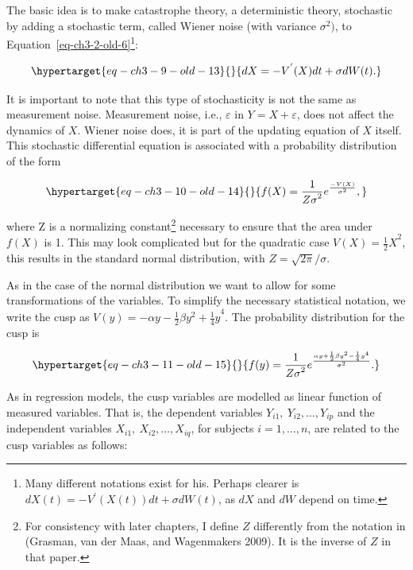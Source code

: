 \documentclass[
  a4paper,
  DIV=11,
  numbers=noendperiod,
  oneside]{scrreprt}
\begin{document}
The basic idea is to make catastrophe theory, a deterministic theory,
stochastic by adding a stochastic term, called Wiener noise (with
variance \(\sigma^{2})\), to Equation~\ref{eq-ch3-2-old-6}\footnote{Many
  different notations exist for his. Perhaps clearer is
  \(dX(t) = - V^{'}\left( X(t) \right)dt + \sigma dW(t)\), as \(dX\) and
  \(dW\) depend on time.}:

\begin{equation}\protect\hypertarget{eq-ch3-9-old-13}{}{
dX = - V^{'}(X)dt + \sigma dW(t).}\label{eq-ch3-9-old-13}\end{equation}

It is important to note that this type of stochasticity is not the same
as measurement noise. Measurement noise, i.e., \(\varepsilon\) in
\(Y = X + \varepsilon\), does not affect the dynamics of \(X\). Wiener
noise does, it is part of the updating equation of \(X\) itself. This
stochastic differential equation is associated with a probability
distribution of the form

\begin{equation}\protect\hypertarget{eq-ch3-10-old-14}{}{
f(X) = \frac{1}{{Z\sigma}^{2}}e^{\frac{- V(X)}{\sigma^{2}}},}\label{eq-ch3-10-old-14}\end{equation}

where Z is a normalizing constant\footnote{For consistency with later
  chapters, I define \(Z\) differently from the notation in (Grasman,
  van der Maas, and Wagenmakers 2009). It is the inverse of \(Z\) in
  that paper.} necessary to ensure that the area under \(f(X)\) is 1.
This may look complicated but for the quadratic case
\(V(X) = {\frac{1}{2}X}^{2}\), this results in the standard normal
distribution, with \(Z = {\sqrt{2\pi}}/{\sigma}\).

As in the case of the normal distribution we want to allow for some
transformations of the variables. To simplify the necessary statistical
notation, we write the cusp as
\(V(y) = {- \alpha y - \frac{1}{2}\beta y^{2} + \frac{1}{4}y}^{4}\). The
probability distribution for the cusp is

\begin{equation}\protect\hypertarget{eq-ch3-11-old-15}{}{
f(y) = \frac{1}{{Z\sigma}^{2}}e^{\frac{\alpha y + \frac{1}{2}\beta y^{2} - \frac{1}{4}y^{4}}{\sigma^{2}}}.}\label{eq-ch3-11-old-15}\end{equation}

As in regression models, the cusp variables are modelled as linear
function of measured variables. That is, the dependent variables
\(Y_{i1},\ Y_{i2},\ldots,Y_{ip}\) and the independent variables
\(X_{i1},\ X_{i2},\ldots,X_{iq}\), for subjects \(i = 1,\ldots,n\), are
related to the cusp variables as follows:
\end{document}
